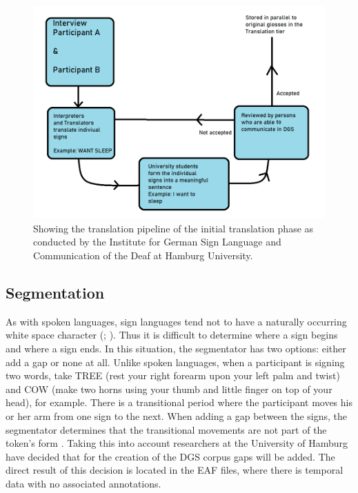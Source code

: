\begin{figure}[h]
\caption{Showing the translation pipeline of the initial translation phase as conducted by the Institute for German Sign Language and Communication of the Deaf at Hamburg University. \cite{konradoffentliches} }
 \centering 
 \includegraphics[width=14cm]{Bachelor CSAI thesis template/images/translation_pipeline.png}
 
 \label{fig:uselesspipeline}
\end{figure}

\subsection{Segmentation}

As with spoken languages, sign languages tend not to have a naturally occurring white space character (\citealp{hankesegmentation}; \citealp{konradoffentliches}). Thus it is difficult to determine where a sign begins and where a sign ends. In this situation, the segmentator has two options: either add a gap or none at all. Unlike spoken languages, when a participant is signing two words, take TREE (rest your right forearm upon your left palm and twist) \cite{perniss2007space} and COW (make two horns using your thumb and little finger on top of your head), for example. There is a transitional period where the participant moves his or her arm from one sign to the next. When adding a gap between the signs, the segmentator determines that the transitional movements are not part of the token's form \cite{konradoffentliches}. Taking this into account researchers at the University of Hamburg have decided that for the creation of the DGS corpus gaps will be added. The direct result of this decision is located in the EAF files, where there is temporal data with no associated annotations.


